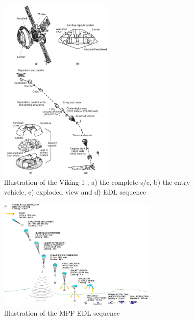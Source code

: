 %
\begin{figure}[!ht]
\centering
\includegraphics[width=0.5\textwidth]{figures/entry_descent/viking1_edl_crankshaft.jpg}
\caption{Illustration of the Viking 1 \cite{crankshaft}; a) the complete \ac{s/c}, b) the entry vehicle, c) exploded view and d) \ac{EDL} sequence}
\label{fig:viking1_edl_crankshaft}
\end{figure}

\begin{figure}[!ht]
\centering
\includegraphics[width=0.7\textwidth]{figures/entry_descent/mpf_edl_isbell1997.jpg}
\caption{Illustration of the \ac{MPF} \ac{EDL} sequence \cite{isbell1997}}
\label{fig:mpf_edl_isbell1997}
\end{figure}

